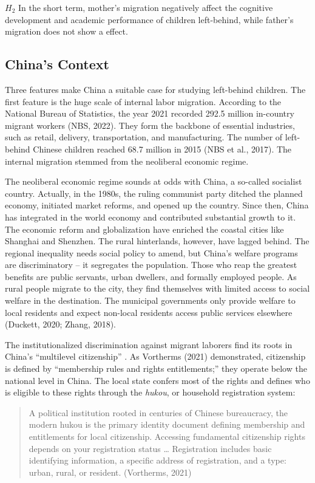 \documentclass[
  man,floatsintext]{apa7}
\begin{document}
\(H_2\) In the short term, mother's migration negatively affect the cognitive development and academic performance of children left-behind, while father's migration does not show a effect.

\hypertarget{chinas-context}{%
\subsection{China's Context}\label{chinas-context}}

Three features make China a suitable case for studying left-behind children. The first feature is the huge scale of internal labor migration. According to the National Bureau of Statistics, the year 2021 recorded 292.5 million in-country migrant workers (NBS, 2022). They form the backbone of essential industries, such as retail, delivery, transportation, and manufacturing. The number of left-behind Chinese children reached 68.7 million in 2015 (NBS et al., 2017). The internal migration stemmed from the neoliberal economic regime.

The neoliberal economic regime sounds at odds with China, a so-called socialist country. Actually, in the 1980s, the ruling communist party ditched the planned economy, initiated market reforms, and opened up the country. Since then, China has integrated in the world economy and contributed substantial growth to it. The economic reform and globalization have enriched the coastal cities like Shanghai and Shenzhen. The rural hinterlands, however, have lagged behind. The regional inequality needs social policy to amend, but China's welfare programs are discriminatory -- it segregates the population. Those who reap the greatest benefits are public servants, urban dwellers, and formally employed people. As rural people migrate to the city, they find themselves with limited access to social welfare in the destination. The municipal governments only provide welfare to local residents and expect non-local residents access public services elsewhere (Duckett, 2020; Zhang, 2018).

The institutionalized discrimination against migrant laborers find its roots in China's ``multilevel citizenship'' . As Vortherms (2021) demonstrated, citizenship is defined by ``membership rules and rights entitlements;'' they operate below the national level in China. The local state confers most of the rights and defines who is eligible to these rights through the \emph{hukou}, or household registration system:

\begin{quote}
A political institution rooted in centuries of Chinese bureaucracy, the modern hukou is the primary identity document defining membership and entitlements for local citizenship. Accessing fundamental citizenship rights depends on your registration status \ldots{} Registration includes basic identifying information, a specific address of registration, and a type: urban, rural, or resident. (Vortherms, 2021)
\end{quote}
\end{document}
